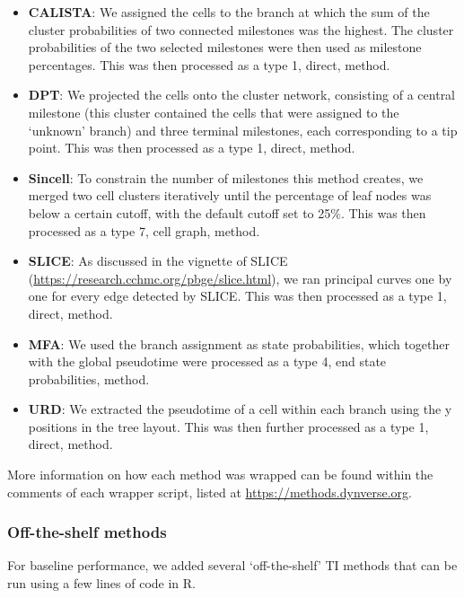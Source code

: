 \begin{itemize}
	\item \textbf{CALISTA}: We assigned the cells to the branch at which the sum of the cluster probabilities of two connected milestones was the highest. The cluster probabilities of the two selected milestones were then used as milestone percentages. This was then processed as a type 1, direct, method.
	\item \textbf{DPT}: We projected the cells onto the cluster network, consisting of a central milestone (this cluster contained the cells that were assigned to the ‘unknown’ branch) and three terminal milestones, each corresponding to a tip point. This was then processed as a type 1, direct, method.
	\item \textbf{Sincell}: To constrain the number of milestones this method creates, we merged two cell clusters iteratively until the percentage of leaf nodes was below a certain cutoff, with the default cutoff set to 25$\%$. This was then processed as a type 7, cell graph, method.
	\item \textbf{SLICE}: As discussed in the vignette of SLICE (\href{https://research.cchmc.org/pbge/slice.html}{https://research.cchmc.org/pbge/slice.html}), we ran principal curves one by one for every edge detected by SLICE. This was then processed as a type 1, direct, method.
	\item \textbf{MFA}: We used the branch assignment as state probabilities, which together with the global pseudotime were processed as a type 4, end state probabilities, method.
	\item \textbf{URD}: We extracted the pseudotime of a cell within each branch using the y positions in the tree layout. This was then further processed as a type 1, direct, method.
	
\end{itemize}



More information on how each method was wrapped can be found within the comments of each wrapper script, listed at \href{https://methods.dynverse.org}{https://methods.dynverse.org}.

\subsubsection{Off-the-shelf methods}

For baseline performance, we added several ‘off-the-shelf’ TI methods that can be run using a few lines of code in R.

